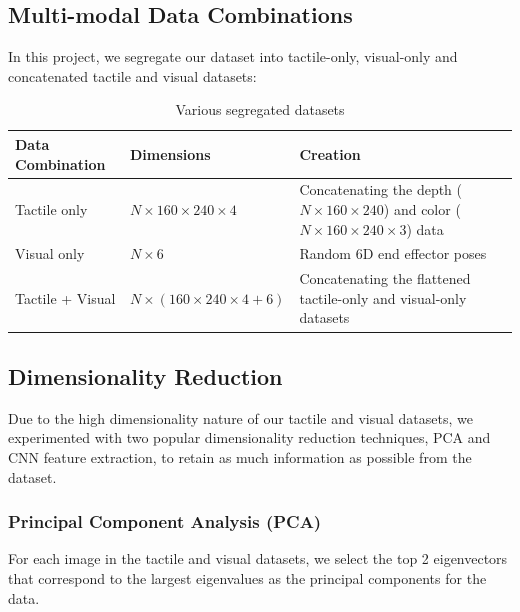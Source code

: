 \documentclass[12pt, a4paper]{report}
\theoremstyle{definition}
\begin{document}
\subsection{Multi-modal Data Combinations}
\label{sec:4.3.1}
In this project, we segregate our dataset into tactile-only, visual-only and concatenated tactile and visual datasets:
\begin{table}[H]
    \centering
    \begin{tabular}{|p{3cm}|p{4cm}|p{6cm}|}
        \hline
        Data Combination & Dimensions & Creation \\
        \hline
        Tactile only & $N\times160\times240\times4$ & Concatenating the depth ($N\times160\times240$) and color ($N\times160\times240\times3$) data \\
        \hline
        Visual only & $N\times6$ & Random 6D end effector poses \\
        \hline
        Tactile + Visual & $N\times(160\times240\times4+6)$ & Concatenating the flattened tactile-only and visual-only datasets \\
        \hline
    \end{tabular}
    \caption{Various segregated datasets}
    \label{tab:4.1}
\end{table}

\subsection{Dimensionality Reduction}
\label{sec:4.3.2}
Due to the high dimensionality nature of our tactile and visual datasets, we experimented with two popular dimensionality reduction techniques, PCA and CNN feature extraction, to retain as much information as possible from the dataset.

\subsubsection{Principal Component Analysis (PCA)}
\label{sec:4.3.2.1}
For each image in the tactile and visual datasets, we select the top 2 eigenvectors that correspond to the largest eigenvalues as the principal components for the data.
\end{document}
